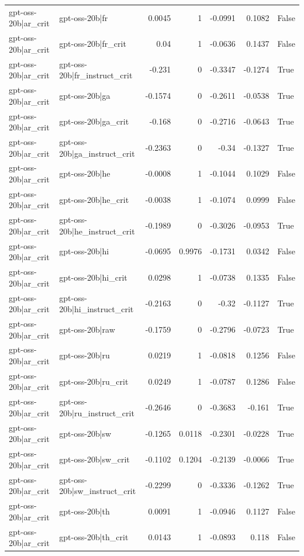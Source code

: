 \begin{table}
\begin{tabular}{l l r r r r l}
gpt-oss-20b|ar_crit & gpt-oss-20b|fr & 0.0045 & 1 & -0.0991 & 0.1082 & False \\
gpt-oss-20b|ar_crit & gpt-oss-20b|fr_crit & 0.04 & 1 & -0.0636 & 0.1437 & False \\
gpt-oss-20b|ar_crit & gpt-oss-20b|fr_instruct_crit & -0.231 & 0 & -0.3347 & -0.1274 & True \\
gpt-oss-20b|ar_crit & gpt-oss-20b|ga & -0.1574 & 0 & -0.2611 & -0.0538 & True \\
gpt-oss-20b|ar_crit & gpt-oss-20b|ga_crit & -0.168 & 0 & -0.2716 & -0.0643 & True \\
gpt-oss-20b|ar_crit & gpt-oss-20b|ga_instruct_crit & -0.2363 & 0 & -0.34 & -0.1327 & True \\
gpt-oss-20b|ar_crit & gpt-oss-20b|he & -0.0008 & 1 & -0.1044 & 0.1029 & False \\
gpt-oss-20b|ar_crit & gpt-oss-20b|he_crit & -0.0038 & 1 & -0.1074 & 0.0999 & False \\
gpt-oss-20b|ar_crit & gpt-oss-20b|he_instruct_crit & -0.1989 & 0 & -0.3026 & -0.0953 & True \\
gpt-oss-20b|ar_crit & gpt-oss-20b|hi & -0.0695 & 0.9976 & -0.1731 & 0.0342 & False \\
gpt-oss-20b|ar_crit & gpt-oss-20b|hi_crit & 0.0298 & 1 & -0.0738 & 0.1335 & False \\
gpt-oss-20b|ar_crit & gpt-oss-20b|hi_instruct_crit & -0.2163 & 0 & -0.32 & -0.1127 & True \\
gpt-oss-20b|ar_crit & gpt-oss-20b|raw & -0.1759 & 0 & -0.2796 & -0.0723 & True \\
gpt-oss-20b|ar_crit & gpt-oss-20b|ru & 0.0219 & 1 & -0.0818 & 0.1256 & False \\
gpt-oss-20b|ar_crit & gpt-oss-20b|ru_crit & 0.0249 & 1 & -0.0787 & 0.1286 & False \\
gpt-oss-20b|ar_crit & gpt-oss-20b|ru_instruct_crit & -0.2646 & 0 & -0.3683 & -0.161 & True \\
gpt-oss-20b|ar_crit & gpt-oss-20b|sw & -0.1265 & 0.0118 & -0.2301 & -0.0228 & True \\
gpt-oss-20b|ar_crit & gpt-oss-20b|sw_crit & -0.1102 & 0.1204 & -0.2139 & -0.0066 & True \\
gpt-oss-20b|ar_crit & gpt-oss-20b|sw_instruct_crit & -0.2299 & 0 & -0.3336 & -0.1262 & True \\
gpt-oss-20b|ar_crit & gpt-oss-20b|th & 0.0091 & 1 & -0.0946 & 0.1127 & False \\
gpt-oss-20b|ar_crit & gpt-oss-20b|th_crit & 0.0143 & 1 & -0.0893 & 0.118 & False \\

\end{tabular}
\end{table}
